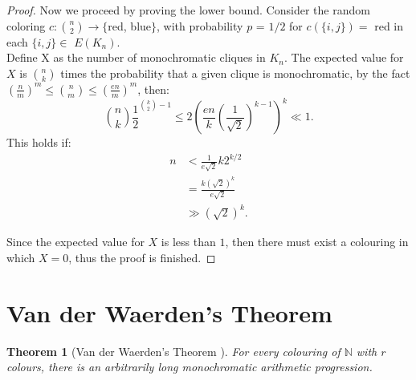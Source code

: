 \documentclass[12pt,twoside,a4paper,bibliography=totocnumbered]{book}
\numberwithin{equation}{section}
\newtheorem{theorem}             {Theorem}[section]
\theoremstyle{remark}
\begin{document}
\begin{proof}
Now we proceed by proving the lower bound. Consider the random coloring $c\colon \binom{n}{2} \rightarrow \{$red, blue$\}$, with probability $p$ = $1/2$ for  $c(\{i,j\}) =$ red in each $\{i,j\} \in$ $E(K_n)$.\\ 
Define X as the number of monochromatic cliques in $K_n$. The expected value for $X$ is $\binom{n}{k}$ times the probability that a given clique is monochromatic, by the fact $\left(\frac{n}{m}\right)^m \leq \binom{n}{m} \leq \left(\frac{en}{m}\right)^m$, then:
$$\binom{n}{k}\frac{1}{2} ^{\binom{k}{2}-1} \leq 2 \left( \frac{en}{k} \left( \frac{1}{\sqrt{2}} \right)^{k-1} \right)^{k} \ll 1.$$ 
This holds if: 
\begin{align*}
n &<\frac{1}{e\sqrt{2}}k2^{k/2} \\
& = \frac{k(\sqrt{2})^{k}}{e\sqrt{2}}\\
& \gg (\sqrt{2})^k.
\end{align*}

Since the expected value for $X$ is less than $1$, then there must exist a colouring in which $X=0$, thus the proof is finished.
\end{proof}

\section{Van der Waerden's Theorem}

\begin{theorem}[{Van der Waerden's Theorem \cite{Van27}}] %
 For every colouring of  $\mathbb{N}$ with $r$ colours, there is an arbitrarily long monochromatic arithmetic progression. 
\end{theorem}
\end{document}
